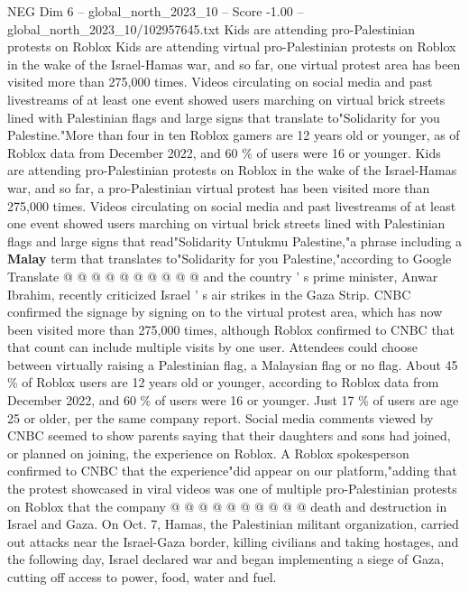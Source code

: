\begin{textsample}{NEG Dim 6 – global\_north\_2023\_10 – Score -1.00 – global\_north\_2023\_10/102957645.txt}  \label{ex:f6_neg_247}
Kids are attending pro-Palestinian protests on Roblox Kids are attending virtual pro-Palestinian protests on Roblox in the wake of the Israel-Hamas war, and so far, one virtual protest area has been visited more than 275,000 times.
Videos circulating on social media and past livestreams of at least one event showed users marching on virtual brick streets lined with Palestinian flags and large signs that translate to"Solidarity for you Palestine."More than four in ten Roblox gamers are 12 years old or younger, as of Roblox data from December 2022, and 60 \% of users were 16 or younger.
Kids are attending pro-Palestinian protests on Roblox in the wake of the Israel-Hamas war, and so far, a pro-Palestinian virtual protest has been visited more than 275,000 times.
Videos circulating on social media and past livestreams of at least one event showed users marching on virtual brick streets lined with Palestinian flags and large signs that read"Solidarity Untukmu Palestine,"a phrase including a \textbf{Malay} term that translates to"Solidarity for you Palestine,"according to Google Translate @ @ @ @ @ @ @ @ @ @ and the country ' s prime minister, Anwar Ibrahim, recently criticized Israel ' s air strikes in the Gaza Strip.
CNBC confirmed the signage by signing on to the virtual protest area, which has now been visited more than 275,000 times, although Roblox confirmed to CNBC that that count can include multiple visits by one user.
Attendees could choose between virtually raising a Palestinian flag, a Malaysian flag or no flag.
About 45 \% of Roblox users are 12 years old or younger, according to Roblox data from December 2022, and 60 \% of users were 16 or younger.
Just 17 \% of users are age 25 or older, per the same company report.
Social media comments viewed by CNBC seemed to show parents saying that their daughters and sons had joined, or planned on joining, the experience on Roblox.
A Roblox spokesperson confirmed to CNBC that the experience"did appear on our platform,"adding that the protest showcased in viral videos was one of multiple pro-Palestinian protests on Roblox that the company @ @ @ @ @ @ @ @ @ @ death and destruction in Israel and Gaza.
On Oct. 7, Hamas, the Palestinian militant organization, carried out attacks near the Israel-Gaza border, killing civilians and taking hostages, and the following day, Israel declared war and began implementing a siege of Gaza, cutting off access to power, food, water and fuel.

\end{textsample}
